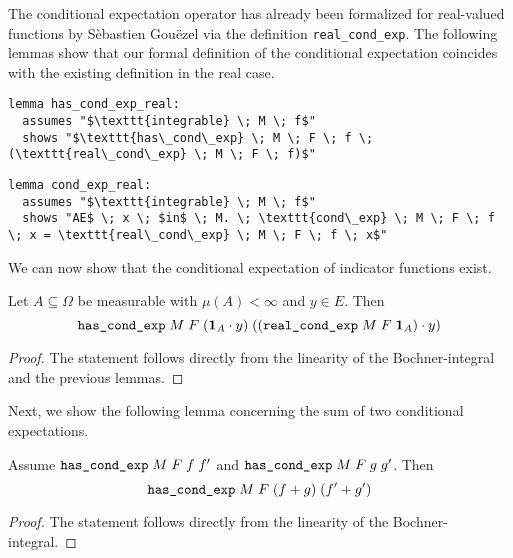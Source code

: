 The conditional expectation operator has already been formalized for real-valued functions by S\`ebastien Gou\"ezel via the definition \texttt{real\_cond\_exp}. The following lemmas show that our formal definition of the conditional expectation coincides with the existing definition in the real case.

\begin{isalemma}
{\small
	\begin{lstlisting}[style=isabelle]
lemma has_cond_exp_real:
  assumes "$\texttt{integrable} \; M \; f$"
  shows "$\texttt{has\_cond\_exp} \; M \; F \; f \; (\texttt{real\_cond\_exp} \; M \; F \; f)$"
	\end{lstlisting}
}
\end{isalemma}

\begin{isalemma}
{\small
	\begin{lstlisting}[style=isabelle]
lemma cond_exp_real:
  assumes "$\texttt{integrable} \; M \; f$"
  shows "AE$ \; x \; $in$ \; M. \; \texttt{cond\_exp} \; M \; F \; f \; x = \texttt{real\_cond\_exp} \; M \; F \; f \; x$" 
	\end{lstlisting}
}
\end{isalemma}

We can now show that the conditional expectation of indicator functions exist.

\begin{lemma}
	Let $A \subseteq \Omega$ be measurable with $\mu(A) < \infty$ and $y \in E$. Then
	\[
		\normalfont\texttt{has\_cond\_exp} \; M \; F \; (\mathbf{1}_A \cdot y) \; ((\texttt{real\_cond\_exp} \; M \; F \; \mathbf{1}_A) \cdot y)
	\]
\end{lemma}
\begin{proof}
	The statement follows directly from the linearity of the Bochner-integral and the previous lemmas.
\end{proof}

Next, we show the following lemma concerning the sum of two conditional expectations.

\begin{lemma}
	Assume $\normalfont\texttt{has\_cond\_exp} \; M \; F \; f \; f'$ and $\normalfont\texttt{has\_cond\_exp} \; M \; F \; g \; g'$. Then
	\[
		\normalfont\texttt{has\_cond\_exp} \; M \; F \; (f + g) \; (f' + g')
	\]
\end{lemma}
\begin{proof}
	The statement follows directly from the linearity of the Bochner-integral.
\end{proof}

